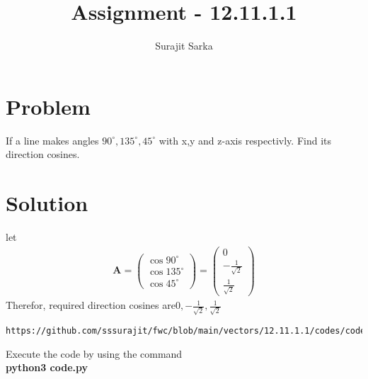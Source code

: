 \documentclass[journal,12pt,twocolumn]{IEEEtran}
\title{\mytitle}
\title{
Assignment - 12.11.1.1
}
\author{Surajit Sarka}
\newcommand{\myvec}[1]{\ensuremath{\begin{pmatrix}#1\end{pmatrix}}}
\let\vec\mathbf
\begin{document}
\maketitle
\tableofcontents
\bigskip
\section{\textbf{Problem}}
If a line makes angles $90^{\circ},135^{\circ},45^{\circ}$ with x,y and z-axis respectivly. Find its direction cosines.
\section{\textbf{Solution}}
let
\begin{align}
\vec{A}=\myvec{\cos 90^{\circ}\\ \cos 135^{\circ}\\ \cos 45^{\circ}}=\myvec{0\\-\frac{1}{\sqrt{2}}\\ \frac{1}{\sqrt{2}}}
\end{align}
Therefor, required direction cosines are$0,-\frac{1}{\sqrt{2}},\frac{1}{\sqrt{2}}$
\begin{lstlisting}
https://github.com/sssurajit/fwc/blob/main/vectors/12.11.1.1/codes/code.py
\end{lstlisting}
Execute the code by using the command\\
\textbf{python3 code.py}
\end{document}
